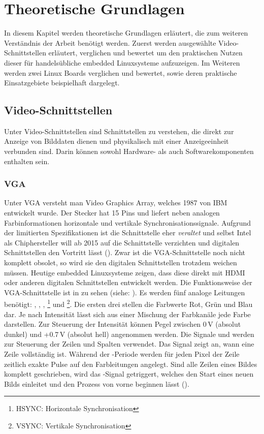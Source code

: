 \chapter{Theoretische Grundlagen}
\label{cha:Grundlagen}
In diesem Kapitel werden theoretische Grundlagen erläutert, die zum weiteren Verständnis der Arbeit benötigt werden. Zuerst werden ausgewählte Video-Schnittstellen erläutert, verglichen und bewertet um den praktischen Nutzen dieser für handelsübliche embedded Linuxsysteme aufzuzeigen. Im Weiteren werden zwei Linux Boards verglichen und bewertet, sowie deren praktische Einsatzgebiete beispielhaft dargelegt.

\section{Video-Schnittstellen}
Unter Video-Schnittstellen sind Schnittstellen zu verstehen, die direkt zur Anzeige von Bilddaten dienen und physikalisch mit einer Anzeigeeinheit verbunden sind. Darin können sowohl Hardware- als auch Softwarekomponenten enthalten sein.
\subsection{VGA}
Unter VGA versteht man Video Graphics Array, welches 1987 von IBM entwickelt wurde. Der Stecker hat 15 Pins und liefert neben analogen Farbinformationen horizontale und vertikale Synchronisationssignale. Aufgrund der limitierten Spezifikationen ist die Schnittstelle eher \textit{veraltet} und selbst Intel als Chiphersteller will ab 2015 auf die Schnittstelle verzichten und digitalen Schnittstellen den Vortritt lässt (\cite{Intel2010}). Zwar ist die VGA-Schnittstelle noch nicht komplett obsolet, so wird sie den digitalen Schnittstellen trotzdem weichen müssen. Heutige embedded Linuxsysteme zeigen, dass diese direkt mit HDMI oder anderen digitalen Schnittstellen entwickelt werden.
Die Funktionsweise der VGA-Schnittstelle ist in  zu sehen (siehe: \cite{Valcarce2011}). Es werden fünf analoge Leitungen benötigt: , , , \footnote{HSYNC: Horizontale Synchronisation} und \footnote{VSYNC: Vertikale Synchronisation}. Die ersten drei stellen die Farbwerte Rot, Grün und Blau dar. Je nach Intensität lässt sich aus einer Mischung der Farbkanäle jede Farbe darstellen. Zur Steuerung der Intensität können Pegel zwischen 0\,V (absolut dunkel) und +0.7\,V (absolut hell) angenommen werden. Die Signale  und  werden zur Steuerung der Zeilen und Spalten verwendet. Das Signal  zeigt an, wann eine Zeile vollständig ist. Während der -Periode werden für jeden Pixel der Zeile zeitlich exakte Pulse auf den Farbleitungen angelegt. Sind alle Zeilen eines Bildes komplett geschrieben, wird das -Signal getriggert, welches den Start eines neuen Bilds einleitet und den Prozess von vorne beginnen lässt (\cite{Valcarce2011}).

